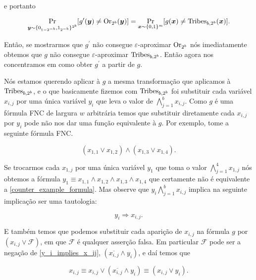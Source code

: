 e portanto

\begin{equation*}
    \Pr_{\boldsymbol{y} \sim \{0_{1 - 2^{-b}}, 1_{2^{-b}} \}^{2^{b}}}[g^{\prime}(\boldsymbol{y}) \neq \text{Or}_{2^{b}}(\boldsymbol{y})] = \Pr_{\boldsymbol{x} \sim \{0, 1\}^{m}}[g(\boldsymbol{x}) \neq \text{Tribes}_{b, 2^{b}}(\boldsymbol{x})].
\end{equation*}

Então, se mostrarmos que $g^{\prime}$ não consegue $\varepsilon$-aproximar $\text{Or}_{2^{b}}$ nós imediatamente obtemos que $g$ não consegue $\varepsilon$-aproximar $\text{Tribes}_{b, 2^{b}}$. Então agora nos concentramos em como obter $g^{\prime}$ a partir de $g$.

Nós estamos querendo aplicar à $g$ a mesma transformação que aplicamos à $\text{Tribes}_{b, 2^{b}}$, e o que basicamente fizemos com $\text{Tribes}_{b, 2^{b}}$ foi substituir cada variável $x_{i, j}$ por uma única variável $y_{i}$ que leva o valor de $\bigwedge_{j = 1}^{b} x_{i, j}$. Como $g$ é uma fórmula FNC de largura $w$ arbitrária temos que substituir diretamente cada $x_{i, j}$ por $y_{i}$ pode não nos dar uma função equivalente à $g$. Por exemplo, tome a seguinte fórmula FNC.

\begin{equation} \label{counter_example_formula}
    (x_{1, 1} \lor x_{1, 2}) \land (x_{1, 3} \lor x_{1, 4}).
\end{equation}

Se trocarmos cada $x_{1, j}$ por uma única variável $y_{1}$ que toma o valor $\bigwedge_{j = 1}^{4} x_{1, j}$ nós obtemos a fórmula $y_{1} \equiv x_{1, 1} \land x_{1, 2} \land x_{1, 3} \land x_{1, 4}$ que certamente não é equivalente a \ref{counter_example_formula}. Mas observe que $y_{i} \bigwedge_{j = 1}^{b} x_{i, j}$ implica na seguinte implicação ser uma tautologia:

\begin{equation} \label{y_i_implies_x_ij}
    y_{i} \Rightarrow x_{i, j}.
\end{equation}

E também temos que podemos substituir cada aparição de $x_{i, j}$ na fórmula $g$ por $(x_{i, j} \lor \mathcal{F})$, em que $\mathcal{F}$ é qualquer asserção falsa. Em particular $\mathcal{F}$ pode ser a negação de \ref{y_i_implies_x_ij}, $(\overline{x_{i, j}} \land y_{i})$, e daí temos que

\begin{equation*}
    x_{i, j} \equiv x_{i, j} \lor (\overline{x_{i, j}} \land y_{i}) \equiv (x_{i, j} \lor y_{i}).
\end{equation*}


